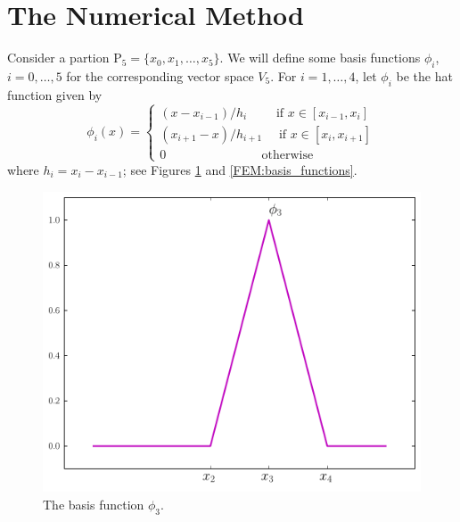\section*{The Numerical Method}
Consider a partion $\mathrm{P}_5 = \{x_0, x_1, \ldots, x_5\}$. We will define some basis functions $\phi_i$, $i = 0, \ldots, 5$ for the corresponding vector space $V_5$. For $i = 1, \ldots, 4$, let $\phi_i$ be the hat function given by 
\[
\phi_i(x) = \begin{cases}
(x - x_{i-1})/h_i \quad \quad\text{ if } x \in [x_{i-1},x_i]\\
 (x_{i+1} - x)/h_{i+1} \quad \text{ if } x \in [x_{i},x_{i+1}]\\
0 \quad \quad \quad \quad \quad \quad \quad \,\,\text{ otherwise}
\end{cases}
\]
where $h_i = x_i - x_{i-1}$; see Figures \ref{FEM:one_basis_function} and \ref{FEM:basis_functions}.


\begin{figure}[ht]
\centering
\includegraphics[width=\textwidth]{one_basis_function.pdf}
\caption{The basis function $\phi_3$.}
\label{FEM:one_basis_function}
\end{figure}


